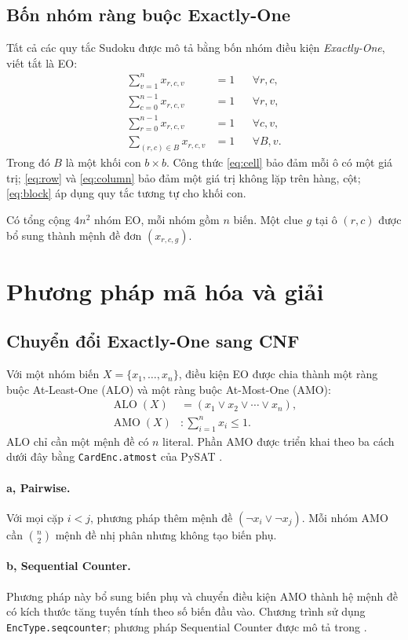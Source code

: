 \documentclass[a4paper,fleqn]{cas-sc}
\begin{document}
\subsection{Bốn nhóm ràng buộc Exactly-One}
Tất cả các quy tắc Sudoku được mô tả bằng bốn nhóm điều kiện \emph{Exactly-One}, viết tắt là EO:
\begin{align}
 \sum_{v=1}^{n}x_{r,c,v}&=1 &&\forall r,c, \label{eq:cell}\\
 \sum_{c=0}^{n-1}x_{r,c,v}&=1 &&\forall r,v, \label{eq:row}\\
 \sum_{r=0}^{n-1}x_{r,c,v}&=1 &&\forall c,v, \label{eq:column}\\
 \sum_{(r,c)\in B}x_{r,c,v}&=1 &&\forall B,v. \label{eq:block}
\end{align}
Trong đó $B$ là một khối con $b\times b$. Công thức \eqref{eq:cell} bảo đảm mỗi ô có một giá trị; \eqref{eq:row} và \eqref{eq:column} bảo đảm một giá trị không lặp trên hàng, cột; \eqref{eq:block} áp dụng quy tắc tương tự cho khối con.

Có tổng cộng $4n^2$ nhóm EO, mỗi nhóm gồm $n$ biến. Một clue $g$ tại ô $(r,c)$ được bổ sung thành mệnh đề đơn $(x_{r,c,g})$.
\section{Phương pháp mã hóa và giải}\label{sec:methods}
\subsection{Chuyển đổi Exactly-One sang CNF}
Với một nhóm biến $X=\{x_1,\ldots,x_n\}$, điều kiện EO được chia thành một ràng buộc At-Least-One (ALO) và một ràng buộc At-Most-One (AMO):
\begin{align}
 \operatorname{ALO}(X)&=(x_1\lor x_2\lor\cdots\lor x_n),\label{eq:alo}\\
 \operatorname{AMO}(X)&:\sum_{i=1}^{n}x_i\le1.\label{eq:amo}
\end{align}
ALO chỉ cần một mệnh đề có $n$ literal. Phần AMO được triển khai theo ba cách dưới đây bằng \texttt{CardEnc.atmost} của PySAT \cite{pysat}.

\paragraph{a, Pairwise.}
Với mọi cặp $i<j$, phương pháp thêm mệnh đề $(\neg x_i\lor\neg x_j)$. Mỗi nhóm AMO cần $\binom{n}{2}$ mệnh đề nhị phân nhưng không tạo biến phụ.

\paragraph{b, Sequential Counter.}
Phương pháp này bổ sung biến phụ và chuyển điều kiện AMO thành hệ mệnh đề có kích thước tăng tuyến tính theo số biến đầu vào. Chương trình sử dụng \texttt{EncType.seqcounter}; phương pháp Sequential Counter được mô tả trong \cite{sinz2005}.
\end{document}
